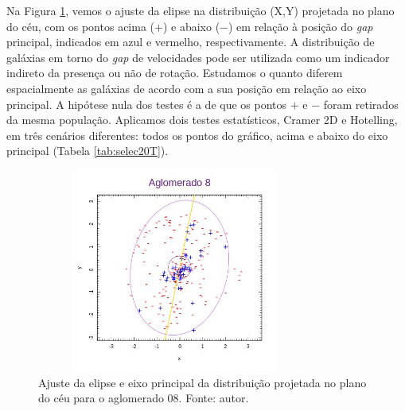 Na Figura \ref{selec20ellipse}, vemos o ajuste da elipse na distribuição (X,Y) projetada no plano do céu, com os pontos acima ($+$) e abaixo ($-$) em relação à posição do \textit{gap} principal, indicados em azul e vermelho, respectivamente. A distribuição de galáxias em torno do \textit{gap} de velocidades pode ser utilizada como um indicador indireto da presença ou não de rotação. Estudamos o quanto diferem espacialmente as galáxias de acordo com a sua posição em relação ao eixo principal. A hipótese nula dos testes é a de que os pontos $+$ e $-$ foram retirados da mesma população. Aplicamos dois testes estatísticos, Cramer 2D e Hotelling, em três cenários diferentes: todos os pontos do gráfico, acima e abaixo do eixo principal (Tabela \ref{tab:selec20T}). 

\begin{figure}[!htbp] %
\vspace{-2pt}
\begin{center}
\includegraphics[height=6.7cm,width=9cm]{04-figuras/selec20ellipse}%
\caption{Ajuste da elipse e eixo principal da distribuição projetada no plano do céu para o aglomerado 08. Fonte: autor.}
\label{selec20ellipse}%
\end{center}
\end{figure}

